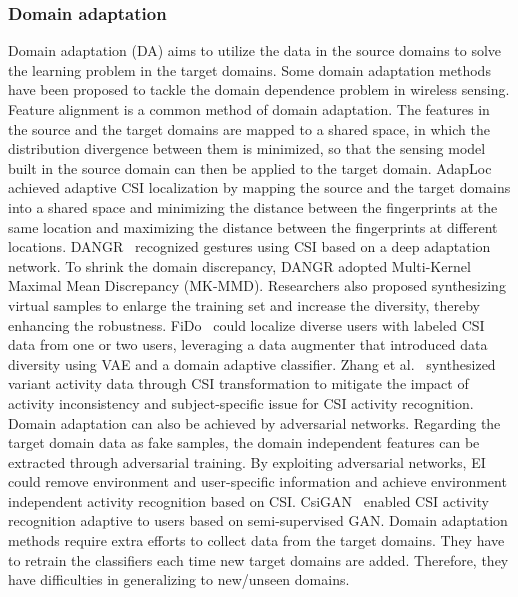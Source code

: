 \subsubsection{Domain adaptation}
Domain adaptation (DA) aims to utilize the data in the source domains to solve the learning problem in the target domains. Some domain adaptation methods have been proposed to tackle the domain dependence problem in wireless sensing.
%
Feature alignment is a common method of domain adaptation. The features in the source and the target domains are mapped to a shared space, in which the distribution divergence between them is minimized, so that the sensing model built in the source domain can then be applied to the target domain. AdapLoc~\cite{ZhouR:2021} achieved adaptive CSI localization by mapping the source and the target domains into a shared space and minimizing the distance between the fingerprints at the same location and maximizing the distance between the fingerprints at different locations. DANGR~\cite{HanZ:2020} recognized gestures using CSI based on a deep adaptation network. To shrink the domain discrepancy, DANGR adopted Multi-Kernel Maximal Mean Discrepancy (MK-MMD).
%
Researchers also proposed synthesizing virtual samples to enlarge the training set and increase the diversity, thereby enhancing the robustness. FiDo~\cite{ChenX:2020} could localize diverse users with labeled CSI data from one or two users, leveraging a data augmenter that introduced data diversity using VAE and a domain adaptive classifier. Zhang et al.~\cite{ZhangJ:2021} synthesized variant activity data through CSI transformation to mitigate the impact of activity inconsistency and subject-specific issue for CSI activity recognition. 
%
Domain adaptation can also be achieved by adversarial networks. Regarding the target domain data as fake samples, the domain independent features can be extracted through adversarial training. By exploiting adversarial networks, EI~\cite{JiangWJ:2018} could remove environment and user-specific information and achieve environment independent activity recognition based on CSI. CsiGAN~\cite{XiaoCJ:2019} enabled CSI activity recognition adaptive to users based on semi-supervised GAN. 
%
Domain adaptation methods require extra efforts to collect data from the target domains. They have to retrain the classifiers each time new target domains are added. Therefore, they have difficulties in generalizing to new/unseen domains.  

